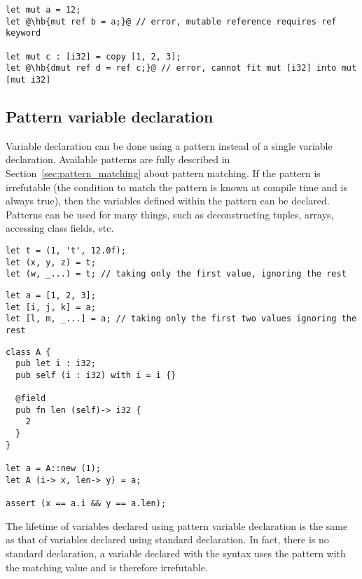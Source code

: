 \begin{lstlisting}[style=coloredverbatim, escapechar=@]
let mut a = 12;
let @\hb{mut ref b = a;}@ // error, mutable reference requires ref keyword

let mut c : [i32] = copy [1, 2, 3];
let @\hb{dmut ref d = ref c;}@ // error, cannot fit mut [i32] into mut [mut i32]
\end{lstlisting}


\subsection{Pattern variable declaration}
\label{sec:pattern_vdecl}

Variable declaration can be done using a pattern instead of a single variable
declaration. Available patterns are fully described in
Section~\ref{sec:pattern_matching} about pattern matching. If the pattern is
irrefutable (the condition to match the pattern is known at compile time and is
always true), then the variables defined within the pattern can be declared.
Patterns can be used for many things, such as deconstructing tuples, arrays,
accessing class fields, etc.
\begin{lstlisting}[style=coloredverbatim, escapechar=@, caption=Tuple deconstruction]
let t = (1, 't', 12.0f);
let (x, y, z) = t;
let (w, _...) = t; // taking only the first value, ignoring the rest
\end{lstlisting}

\begin{lstlisting}[style=coloredverbatim, escapechar=@, caption=Array deconstruction]
let a = [1, 2, 3];
let [i, j, k] = a;
let [l, m, _...] = a; // taking only the first two values ignoring the rest
\end{lstlisting}

\begin{lstlisting}[style=coloredverbatim, caption=Class field access]
class A {
  pub let i : i32;
  pub self (i : i32) with i = i {}

  @field
  pub fn len (self)-> i32 {
    2
  }
}

let a = A::new (1);
let A (i-> x, len-> y) = a;

assert (x == a.i && y == a.len);
\end{lstlisting}

The lifetime of variables declared using pattern variable declaration is the
same as that of variables declared using standard declaration. In fact, there is
no standard declaration, a variable declared with the syntax  uses the pattern  with the matching value 
and is therefore irrefutable.

